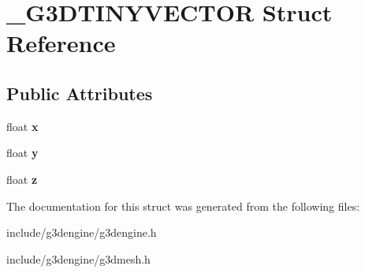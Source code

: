 \hypertarget{struct__G3DTINYVECTOR}{}\section{\+\_\+\+G3\+D\+T\+I\+N\+Y\+V\+E\+C\+T\+OR Struct Reference}
\label{struct__G3DTINYVECTOR}
\subsection*{Public Attributes}
\begin{DoxyCompactItemize}
\item 
\mbox{\label{struct__G3DTINYVECTOR_a17d3693548709cf49d0c58f7fe198f05}} 
float {\bfseries x}
\item 
\mbox{\label{struct__G3DTINYVECTOR_af48f36e849281d17c1b304070e3ebf8e}} 
float {\bfseries y}
\item 
\mbox{\label{struct__G3DTINYVECTOR_af3b0411bc9db051ace1b05cd3220496a}} 
float {\bfseries z}
\end{DoxyCompactItemize}


The documentation for this struct was generated from the following files\+:\begin{DoxyCompactItemize}
\item 
include/g3dengine/g3dengine.\+h\item 
include/g3dengine/g3dmesh.\+h\end{DoxyCompactItemize}
